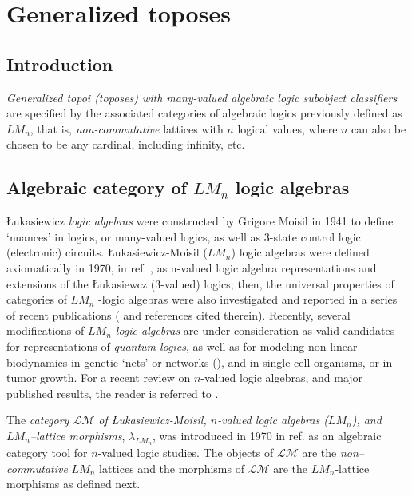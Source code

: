 \documentclass[12pt]{article}
\theoremstyle{plain}
\theoremstyle{definition}
\begin{document}
\section{Generalized toposes}
\subsection{Introduction}

 \emph{Generalized topoi (toposes) with many-valued algebraic logic subobject classifiers}
are specified by the associated categories of algebraic logics previously defined as $LM_n$, that is, {\em non-commutative} lattices with $n$ logical values, where $n$ can also be chosen to be any cardinal, including infinity, etc.

\subsection{Algebraic category of $LM_n$ logic algebras}
 
 \L{}ukasiewicz \emph{logic algebras} were constructed by Grigore Moisil in 1941 to define `nuances' in logics, or many-valued logics, as well as 3-state control logic (electronic) circuits. \L{}ukasiewicz-Moisil ($LM_n$) logic algebras were defined axiomatically in 1970, in ref. \cite{GG-CV70}, as n-valued logic algebra representations and extensions of the \L ukasiewcz (3-valued) logics; then, the universal properties of categories of $LM_n$ -logic algebras were also investigated and reported in a series of recent publications (\cite{GG2k6} and references cited therein). Recently, several modifications of {\em $LM_n$-logic algebras} are under consideration as valid candidates for representations of {\em quantum logics}, as well as for modeling non-linear biodynamics in genetic `nets' or networks (\cite{ICB77}), and in single-cell organisms, or in tumor growth. For a recent review on $n$-valued logic algebras, and major published results, the reader is referred to \cite{GG2k6}.

 The \emph{category $\mathcal{LM}$ of \L{}ukasiewicz-Moisil, $n$-valued logic algebras ($LM_n$), and $LM_n$--lattice morphisms}, $\lambda_{LM_n}$, was introduced in 1970 in ref. \cite{GG-CV70} as an algebraic category tool for $n$-valued logic studies. The objects of $\mathcal{LM}$ are the \emph{non--commutative} $LM_n$ lattices and the morphisms of $\mathcal{LM}$ are the $LM_n$-lattice morphisms as defined next.
\end{document}
